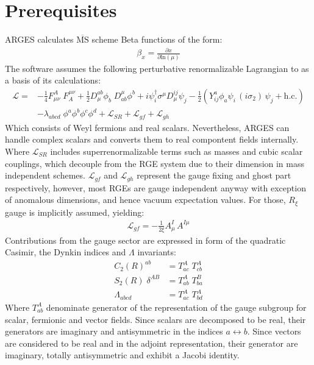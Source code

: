\documentclass{scrartcl}
\begin{document}
\section{Prerequisites}
ARGES calculates $\overline{\mathrm{MS}}$ scheme Beta functions of the form:
\begin{align}
\beta_x = \frac{\partial x}{\partial \mathrm{ln}(\mu)}
\end{align}
The software assumes the following perturbative renormalizable Lagrangian to as a basis of its calculations:
\begin{align}
\mathcal{L} = &-\frac{1}{4} F^A_{\mu\nu}\; F_A^{\mu \nu} + \frac{1}{2} D^{ab}_\mu \phi_b \; D_{ab}^\mu \phi^b + i \psi_i^\dagger \sigma^\mu D^{ij}_\mu \psi_j - \frac{1}{2}( Y^a_{ij} \phi_a \psi_i \,(i \sigma_2)\, \psi_j + \mathrm{h.c.} ) \nonumber \\
&- \lambda_{abcd}\; \phi^a \phi^b \phi^c \phi^d + \mathcal{L}_{SR} + \mathcal{L}_{gf} + \mathcal{L}_{gh}
\end{align}
Which consists of Weyl fermions and real scalars. Nevertheless, ARGES can handle complex scalars and converts them to real compontent fields internally.
Where $\mathcal{L}_{SR}$ includes superrenormalizable terms such as masses and cubic scalar couplings, which decouple from the RGE system due to their dimension in mass independent schemes. $\mathcal{L}_{gf}$ and $\mathcal{L}_{gh}$ represent the gauge fixing and ghost part respectively, however, most RGEs are gauge independent anyway with exception of anomalous dimensions, and hence vacuum expectation values. For those, $R_\xi$ gauge is implicitly assumed, yielding:
\begin{align}
\mathcal{L}_{gf} = -\frac{1}{2 \xi} A^I_\mu \,A^{I \mu} 
\end{align}
Contributions from the gauge sector are expressed in form of the quadratic Casimir, the Dynkin indices and $\Lambda$ invariants:
\begin{align}
C_2(R)^{ab} &= T^A_{ac} \;T^A_{cb} \\
S_2(R) \;\delta^{AB} &= T^A_{ab} \; T^B_{ba} \\
\Lambda_{abcd} &= T^A_{ac} \; T^A_{bd}
\end{align}
Where $T^A_{ab}$ denominate generator of the representation of the gauge subgroup for scalar, fermionic and vector fields. Since scalars are decomposed to be real, their generators are imaginary and antisymmetric in the indices $a \leftrightarrow b$. Since vectors are considered to be real and in the adjoint representation, their generator are imaginary, totally antisymmetric and exhibit a Jacobi identity.
\newpage
\end{document}
